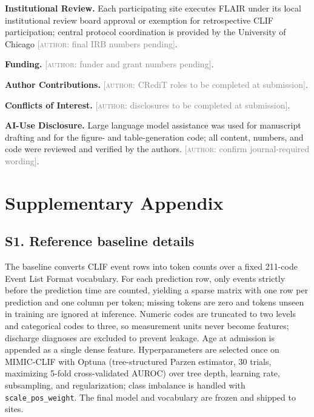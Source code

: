 \documentclass[12pt]{article}
\newcommand{\confirm}[1]{\textcolor{gray}{[\textsc{author}: #1]}}
\begin{document}
\textbf{Institutional Review.} Each participating site executes FLAIR under its local institutional review board approval or exemption for retrospective CLIF participation; central protocol coordination is provided by the University of Chicago \confirm{final IRB numbers pending}.

\textbf{Funding.} \confirm{funder and grant numbers pending}.

\textbf{Author Contributions.} \confirm{CRediT roles to be completed at submission}.

\textbf{Conflicts of Interest.} \confirm{disclosures to be completed at submission}.

\textbf{AI-Use Disclosure.} Large language model assistance was used for manuscript drafting and for the figure- and table-generation code; all content, numbers, and code were reviewed and verified by the authors. \confirm{confirm journal-required wording}.

\appendix
\section{Supplementary Appendix}
\renewcommand{\thetable}{S\arabic{table}}
\renewcommand{\theHtable}{S\arabic{table}}
\renewcommand{\thefigure}{S\arabic{figure}}
\renewcommand{\theHfigure}{S\arabic{figure}}
\setcounter{table}{0}
\setcounter{figure}{0}

\subsection*{S1. Reference baseline details}

The baseline converts CLIF event rows into token counts over a fixed 211-code Event List Format vocabulary. For each prediction row, only events strictly before the prediction time are counted, yielding a sparse matrix with one row per prediction and one column per token; missing tokens are zero and tokens unseen in training are ignored at inference. Numeric codes are truncated to two levels and categorical codes to three, so measurement units never become features; discharge diagnoses are excluded to prevent leakage. Age at admission is appended as a single dense feature. Hyperparameters are selected once on MIMIC-CLIF with Optuna (tree-structured Parzen estimator, 30 trials, maximizing 5-fold cross-validated AUROC) over tree depth, learning rate, subsampling, and regularization; class imbalance is handled with \texttt{scale\_pos\_weight}. The final model and vocabulary are frozen and shipped to sites.
\end{document}
